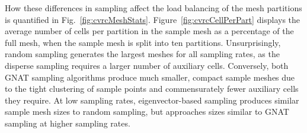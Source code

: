 How these differences in sampling affect the load balancing of the mesh partitions is quantified in Fig.~\ref{fig:cvrcMeshStats}. Figure~\ref{fig:cvrcCellPerPart}
displays the average number of cells per partition in the sample mesh as a percentage of the full mesh, when the sample mesh is split into ten partitions. Unsurprisingly, random sampling generates the largest meshes for all sampling rates, as the disperse sampling requires a larger number of auxiliary cells. Conversely, both GNAT sampling algorithms produce much smaller, compact sample meshes due to the tight clustering of sample points and commensurately fewer auxiliary cells they require. At low sampling rates, eigenvector-based sampling produces similar sample mesh sizes to random sampling, but approaches sizes similar to GNAT sampling at higher sampling rates. 

